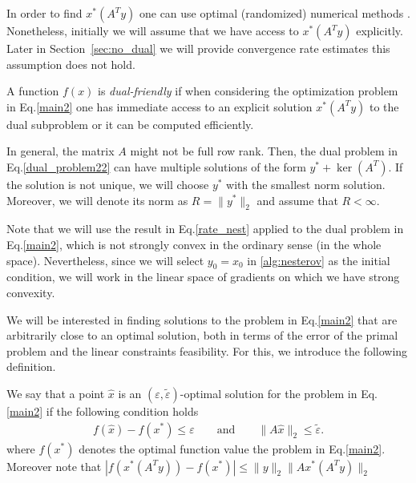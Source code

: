 \documentclass[final]{siamart1116}
\numberwithin{theorem}{section}
\begin{document}
%	
	In order to find $x^*(A^Ty)$ one can use optimal (randomized) numerical methods \cite{nes13,nes94}. Nonetheless, initially we will assume that we have access to $x^*(A^Ty)$ explicitly. Later in Section~\ref{sec:no_dual} we will provide convergence rate estimates this assumption does not hold. 
	
	\begin{definition} 
		A function $f(x)$ is \textit{dual-friendly} if when considering the optimization problem in Eq.\eqref{main2} one has immediate access to an explicit solution $x^*(A^Ty)$ to the dual subproblem or it can be computed efficiently.
	\end{definition}
	
		In general, the matrix $A$ might not be full row rank. Then, the dual problem in Eq.\eqref{dual_problem22} can have multiple solutions of the form $y^* + \ker(A^T)$. If the solution is not unique, we will choose $y^*$ with the smallest norm solution. Moreover, we will denote its norm as $R = \|y^*\|_2$ and assume that $R < \infty$. 
		
		Note that we will use the result in Eq.\cref{rate_nest} applied to the dual problem in Eq.\eqref{main2}, which is not strongly convex in the ordinary sense (in the whole space). Nevertheless, since we will select $y_0 = x_0$ in \cref{alg:nesterov} as the initial condition, we will work in the linear space of gradients on which we have strong convexity.
	
	We will be interested in finding solutions to the problem in Eq.\eqref{main2} that are arbitrarily close to an optimal solution, both in terms of the error of the primal problem and the linear constraints feasibility. For this, we introduce the following definition.
	\begin{definition}
		We say that a point $\hat x$ is an $(\varepsilon,\tilde{\varepsilon})$-optimal solution for the problem in Eq.\eqref{main2} if the following condition holds
		\begin{align*}
		f(\hat x ) - f(x^*) \le  \varepsilon \qquad \text{and} \qquad \|A\hat x\|_2 \leq \tilde{\varepsilon}.
		\end{align*} 
		where $f(x^*)$ denotes the optimal function value the problem in Eq.\eqref{main2}. Moreover note that $\left| f(x^*(A^Ty) ) - f(x^*) \right| \le \|y\|_2\|Ax^*(A^Ty)\|_2 $
	\end{definition}
\end{document}
